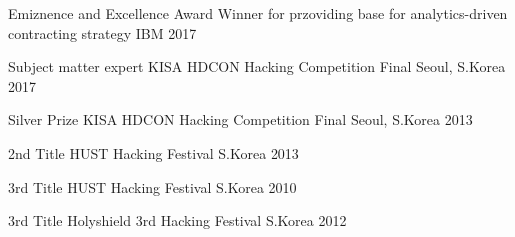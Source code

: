 \begin{cvhonors}

  \cvhonor
    {Emiznence and Excellence Award Winner} %
    {for przoviding base for analytics-driven contracting strategy} %
    {IBM} %
    {2017} %

  \cvhonor
    {Subject matter expert} %
    {KISA HDCON Hacking Competition Final} %
    {Seoul, S.Korea} %
    {2017} %

  \cvhonor
    {Silver Prize} %
    {KISA HDCON Hacking Competition Final} %
    {Seoul, S.Korea} %
    {2013} %

  \cvhonor
    {2nd Title} %
    {HUST Hacking Festival} %
    {S.Korea} %
    {2013} %

  \cvhonor
    {3rd Title} %
    {HUST Hacking Festival} %
    {S.Korea} %
    {2010} %

  \cvhonor
    {3rd Title} %
    {Holyshield 3rd Hacking Festival} %
    {S.Korea} %
    {2012} %

\end{cvhonors}
